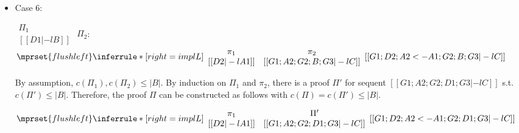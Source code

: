 \begin{itemize}
\item Case 6:
    \begin{center}
      \scriptsize
      \begin{math}
        \begin{array}{c}
          \Pi_1 \\
          {[[D1 |-l B]]}
        \end{array}
      \end{math}
      \qquad\qquad
      $\Pi_2$:
      \begin{math}
        $$\mprset{flushleft}
        \inferrule* [right={\tiny implL}] {
          {
            \begin{array}{cc}
              \pi_1 & \pi_2 \\
              {[[D2 |-l A1]]} & {[[G1; A2; G2; B; G3 |-l C]]}
            \end{array}
          }
        }{[[G1; D2; A2 <- A1; G2; B; G3 |-l C]]}
      \end{math}
    \end{center}
    By assumption, $c(\Pi_1),c(\Pi_2)\leq |B|$. By induction on $\Pi_1$ and
    $\pi_2$, there is a proof $\Pi'$ for sequent
    $[[G1; A2; G2; D1; G3 |-l C]]$ s.t. $c(\Pi') \leq |B|$. Therefore, the
    proof $\Pi$ can be constructed as follows with
    $c(\Pi) = c(\Pi') \leq |B|$.
    \begin{center}
      \scriptsize
      \begin{math}
        $$\mprset{flushleft}
        \inferrule* [right={\tiny implL}] {
          {
            \begin{array}{cc}
              \pi_1 & \Pi' \\
              {[[D2 |-l A1]]} & {[[G1; A2; G2; D1; G3 |-l C]]}
            \end{array}
          }
        }{[[G1; D2; A2 <- A1; G2; D1; G3 |-l C]]}
      \end{math}
    \end{center}
\end{itemize}





